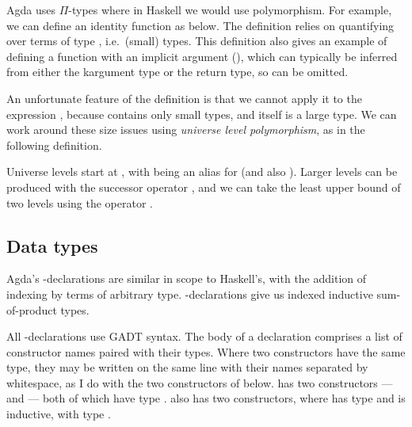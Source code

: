 Agda uses $\Pi$-types where in Haskell we would use polymorphism.
For example, we can define an identity function as below.
The definition relies on quantifying over terms of type ,
i.e.\ (small) types.
This definition also gives an example of defining a function with an implicit
argument (), which can typically be inferred from either the
kargument type or the return type, so can be omitted.


An unfortunate feature of the definition  is that we cannot
apply it to the expression , because 
contains only small types, and itself is a large type.
We can work around these size issues using \emph{universe level polymorphism},
as in the following definition.


Universe levels start at , with  being
an alias for \AgdaSpace{} (and also
).
Larger levels can be produced with the successor operator ,
and we can take the least upper bound of two levels using the operator
\AgdaPrimitive{\_$\sqcup$\_}.

\subsection{Data types}

Agda's -declarations are similar in scope to Haskell's, with
the addition of indexing by terms of arbitrary type.
-declarations give us indexed inductive sum-of-product types.

All -declarations use GADT syntax.
The body of a declaration comprises a list of constructor names paired with
their types.
Where two constructors have the same type, they may be written on the same line
with their names separated by whitespace, as I do with the two constructors of
 below.
 has two constructors ---  and
 --- both of which have type
.
 also has two constructors, where
 has type  and
 is inductive, with type
\AgdaSpace{}\AgdaKeyword{$\to$}\AgdaSpace{}%
.

